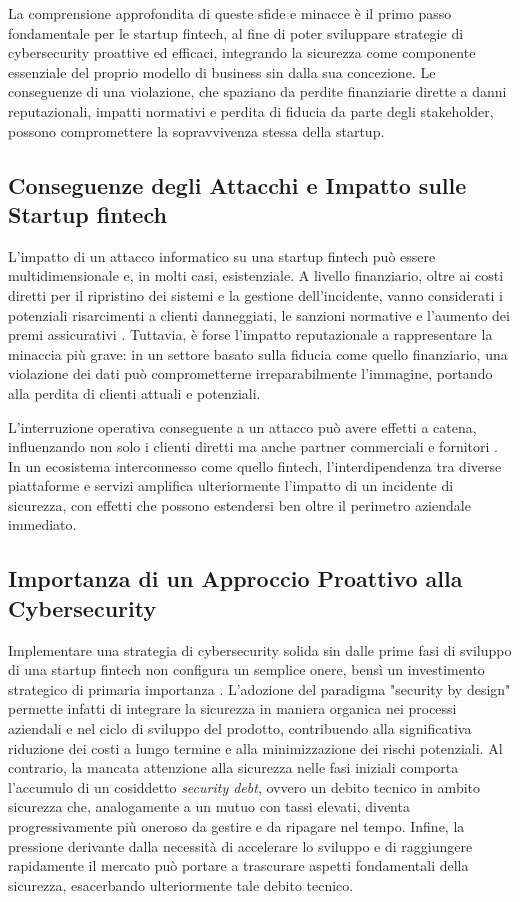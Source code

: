 La comprensione approfondita di queste sfide e minacce è il primo passo fondamentale per le startup fintech, al fine di poter sviluppare strategie di cybersecurity proattive ed efficaci, integrando la sicurezza come componente essenziale del proprio modello di business sin dalla sua concezione. Le conseguenze di una violazione, che spaziano da perdite finanziarie dirette a danni reputazionali, impatti normativi e perdita di fiducia da parte degli stakeholder, possono compromettere la sopravvivenza stessa della startup.

\subsection{Conseguenze degli Attacchi e Impatto sulle Startup fintech}

L'impatto di un attacco informatico su una startup fintech può essere multidimensionale e, in molti casi, esistenziale. A livello finanziario, oltre ai costi diretti per il ripristino dei sistemi e la gestione dell'incidente, vanno considerati i potenziali risarcimenti a clienti danneggiati, le sanzioni normative e l'aumento dei premi assicurativi \cite{fintechChallenges}. Tuttavia, è forse l'impatto reputazionale a rappresentare la minaccia più grave: in un settore basato sulla fiducia come quello finanziario, una violazione dei dati può comprometterne irreparabilmente l'immagine, portando alla perdita di clienti attuali e potenziali.

L'interruzione operativa conseguente a un attacco può avere effetti a catena, influenzando non solo i clienti diretti ma anche partner commerciali e fornitori \cite{fintechChallenges}. In un ecosistema interconnesso come quello fintech, l'interdipendenza tra diverse piattaforme e servizi amplifica ulteriormente l'impatto di un incidente di sicurezza, con effetti che possono estendersi ben oltre il perimetro aziendale immediato.

\subsection{Importanza di un Approccio Proattivo alla Cybersecurity}

Implementare una strategia di cybersecurity solida sin dalle prime fasi di sviluppo di una startup fintech non configura un semplice onere, bensì un investimento strategico di primaria importanza \cite{fintechChallenges}. L'adozione del paradigma "security by design" permette infatti di integrare la sicurezza in maniera organica nei processi aziendali e nel ciclo di sviluppo del prodotto, contribuendo alla significativa riduzione dei costi a lungo termine e alla minimizzazione dei rischi potenziali. Al contrario, la mancata attenzione alla sicurezza nelle fasi iniziali comporta l'accumulo di un cosiddetto \textit{security debt}, ovvero un debito tecnico in ambito sicurezza che, analogamente a un mutuo con tassi elevati, diventa progressivamente più oneroso da gestire e da ripagare nel tempo. Infine, la pressione derivante dalla necessità di accelerare lo sviluppo e di raggiungere rapidamente il mercato può portare a trascurare aspetti fondamentali della sicurezza, esacerbando ulteriormente tale debito tecnico.

